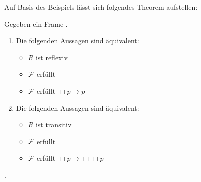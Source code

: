 Auf Basis des Beispiels lässt sich folgendes Theorem aufstellen:

\begin{theorem}
	Gegeben ein Frame \FrameDef.
	\begin{enumerate}
		\item Die folgenden Aussagen sind äquivalent:
		\begin{itemize}
			\item $R$ ist reflexiv
			\item $\mathcal{F}$ erfüllt \TFormel
			\item $\mathcal{F}$ erfüllt $\Box p \rightarrow p$
		\end{itemize} 
		
		\item Die folgenden Aussagen sind äquivalent:
		\begin{itemize}
			\item $R$ ist transitiv
			\item $\mathcal{F}$ erfüllt \vierFormel
			\item $\mathcal{F}$ erfüllt $\Box p \rightarrow \Box \Box p$
		\end{itemize}
	\end{enumerate}
	.
\end{theorem}

